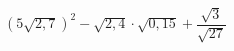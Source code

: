 \begin{ex}[type=calculate]
	\begin{condition}
		\( (5\sqrt{2,7})^2-\sqrt{2,4}\cdot\sqrt{0,15}+\dfrac{\sqrt{3}}{\sqrt{27}} \)
	\end{condition}
\end{ex}